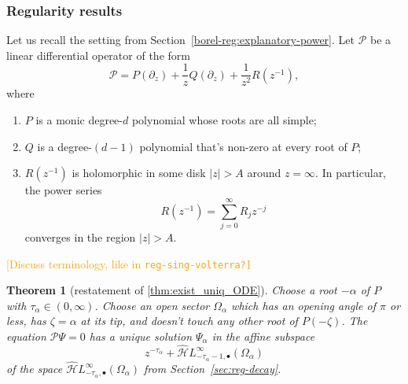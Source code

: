 \documentclass{article}
\newcommand{\dualsingexp}[2]{\widehat{\mathcal{H}}L^\infty_{#1, #2}}
\newcommand{\dualsingexpalg}[1]{\dualsingexp{#1}{\bullet}}
\newcommand{\C}{\mathbb{C}}
\theoremstyle{definition}
\theoremstyle{plain}
\newtheorem{theorem}{Theorem}[section]
\begin{document}
\subsubsection{Regularity results}
Let us recall the setting from Section~\ref{borel-reg:explanatory-power}. Let $\mathcal{P}$ be a linear differential operator of the form
\begin{equation}\label{eqn:operator-P}
    \mathcal{P} = P(\partial_z) + \frac{1}{z} Q(\partial_z) + \frac{1}{z^2} R(z^{-1}),
\end{equation}
where
\begin{enumerate}
\item $P$ is a monic degree-$d$ polynomial whose roots are all simple; 
\item $Q$ is a degree-$(d-1)$ polynomial that's non-zero at every root of $P$;
\item $R(z^{-1})$ is holomorphic in some disk $|z| > A$ around $z = \infty$. In particular, the power series
\[ R(z^{-1}) = \sum_{j=0}^\infty R_j z^{-j} \]
converges in the region $|z| > A$.
\end{enumerate}
\textcolor{orange}{[Discuss terminology, like in \tt{reg-sing-volterra}?]}
\color{BlueViolet}
\begin{theorem}[restatement of \ref{thm:exist_uniq_ODE}]\label{thm:exist_uniq_ODE_proof}
Choose a root $-\alpha$ of $P$ with $\tau_\alpha \in (0, \infty)$. Choose an open sector $\Omega_\alpha$ which has an opening angle of $\pi$ or less, has $\zeta = \alpha$ at its tip, and doesn't touch any other root of $P(-\zeta)$. The equation $\mathcal{P}\Psi = 0$ has a unique solution $\Psi_\alpha$ in the affine subspace
\[ z^{-\tau_\alpha} + \dualsingexpalg{-\tau_\alpha-1}(\Omega_\alpha) \]
of the space $\dualsingexpalg{-\tau_\alpha}(\Omega_\alpha)$ from Section~\ref{sec:reg-decay}.
\end{theorem}
\end{document}
